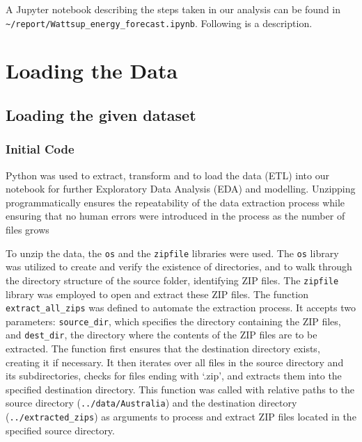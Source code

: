 \documentclass[mstat,12pt]{unswthesis}
\begin{document}
A Jupyter notebook describing the steps taken in our analysis can be
found in
\texttt{\textasciitilde{}/report/Wattsup\_energy\_forecast.ipynb}.
Following is a description.

\section{Loading the Data}\label{loading-the-data}

\subsection{Loading the given dataset}\label{loading-the-given-dataset}

\subsubsection{Initial Code}\label{initial-code}

Python was used to extract, transform and to load the data (ETL) into
our notebook for further Exploratory Data Analysis (EDA) and modelling.
Unzipping programmatically ensures the repeatability of the data
extraction process while ensuring that no human errors were introduced
in the process as the number of files grows

To unzip the data, the \texttt{os} and the \texttt{zipfile} libraries
were used. The \texttt{os} library was utilized to create and verify the
existence of directories, and to walk through the directory structure of
the source folder, identifying ZIP files. The \texttt{zipfile} library
was employed to open and extract these ZIP files. The function
\texttt{extract\_all\_zips} was defined to automate the extraction
process. It accepts two parameters: \texttt{source\_dir}, which
specifies the directory containing the ZIP files, and
\texttt{dest\_dir}, the directory where the contents of the ZIP files
are to be extracted. The function first ensures that the destination
directory exists, creating it if necessary. It then iterates over all
files in the source directory and its subdirectories, checks for files
ending with `.zip', and extracts them into the specified destination
directory. This function was called with relative paths to the source
directory
(\texttt{\textquotesingle{}../data/Australia\textquotesingle{}}) and the
destination directory
(\texttt{\textquotesingle{}../extracted\_zips\textquotesingle{}}) as
arguments to process and extract ZIP files located in the specified
source directory.
\end{document}
